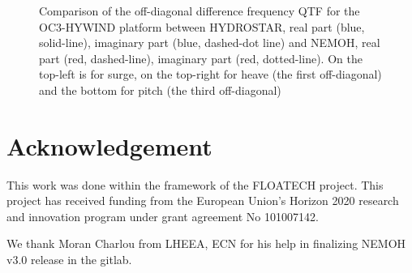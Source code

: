 \documentclass[12pt,a4paper,titlepage]{article}
\begin{document}
\begin{figure}[ht!]
{}
	\caption{Comparison of the off-diagonal difference frequency QTF for the OC3-HYWIND platform between HYDROSTAR, real part (blue, solid-line), imaginary part (blue, dashed-dot line) and NEMOH, real part (red, dashed-line), imaginary part (red, dotted-line). On the top-left is for surge, on the top-right for heave (the first off-diagonal) and the bottom for pitch (the third off-diagonal)}\label{fig:QTFM_diag_OC3_HYWIND}
\end{figure}

\section*{Acknowledgement}
This work was done within the framework of the FLOATECH project. This project has received funding from the European Union’s Horizon 2020 research and innovation program under grant agreement No 101007142.

We thank Moran Charlou from LHEEA, ECN for his help in finalizing NEMOH v3.0 release in the gitlab.




\end{document}
